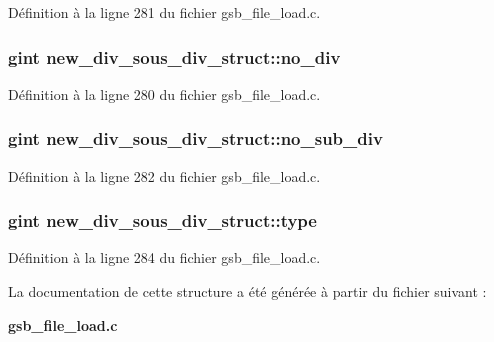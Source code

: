 Définition à la ligne 281 du fichier gsb\_\-file\_\-load.c.

\subsubsection[{no\_\-div}]{\setlength{\rightskip}{0pt plus 5cm}gint {\bf new\_\-div\_\-sous\_\-div\_\-struct::no\_\-div}}\label{structnew__div__sous__div__struct_a1e2817a5c8bfd33ff8bbea7c63d2a3c5}


Définition à la ligne 280 du fichier gsb\_\-file\_\-load.c.

\subsubsection[{no\_\-sub\_\-div}]{\setlength{\rightskip}{0pt plus 5cm}gint {\bf new\_\-div\_\-sous\_\-div\_\-struct::no\_\-sub\_\-div}}\label{structnew__div__sous__div__struct_a1e7a17ba17f63a5943a5f497fca27997}


Définition à la ligne 282 du fichier gsb\_\-file\_\-load.c.

\subsubsection[{type}]{\setlength{\rightskip}{0pt plus 5cm}gint {\bf new\_\-div\_\-sous\_\-div\_\-struct::type}}\label{structnew__div__sous__div__struct_a1dcd4a7283ce82e1faed44257931ba99}


Définition à la ligne 284 du fichier gsb\_\-file\_\-load.c.



La documentation de cette structure a été générée à partir du fichier suivant :\begin{DoxyCompactItemize}
\item 
{\bf gsb\_\-file\_\-load.c}\end{DoxyCompactItemize}
